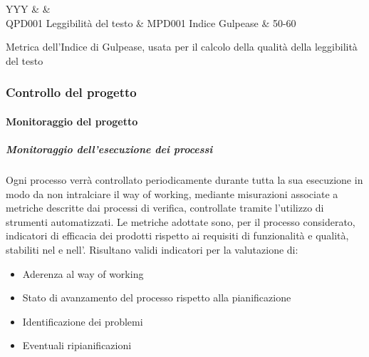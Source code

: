 			\begin{table}[H]
				\begin{detailtable}{\textwidth}{YYY}
					 &
					 &
					\\\toprule
					QPD001 Leggibilità del testo & MPD001 Indice Gulpease & 50-60\\
				\end{detailtable}
				\caption[Metrica Indice di Gulpease]{Metrica dell'Indice di Gulpease, usata per il calcolo della qualità della leggibilità del testo}
			\end{table}

		\subsubsection{Controllo del progetto}

			\paragraph{Monitoraggio del progetto}

			\subparagraph{Monitoraggio dell'esecuzione dei processi}
			Ogni processo verrà controllato periodicamente durante tutta la sua esecuzione in modo da non intralciare il way of working,
			mediante misurazioni associate a metriche descritte dai processi di verifica, controllate tramite l'utilizzo di strumenti automatizzati.
			Le metriche adottate sono, per il processo considerato, indicatori di efficacia dei prodotti rispetto ai requisiti di funzionalità e qualità,
			stabiliti nel \Doc{\PdQv} e nell'\Doc{\AdRv}. Risultano validi indicatori per la valutazione di:
			\begin{itemize}
				\item Aderenza al way of working
				\item Stato di avanzamento del processo rispetto alla pianificazione
				\item Identificazione dei problemi
				\item Eventuali ripianificazioni
			\end{itemize}


